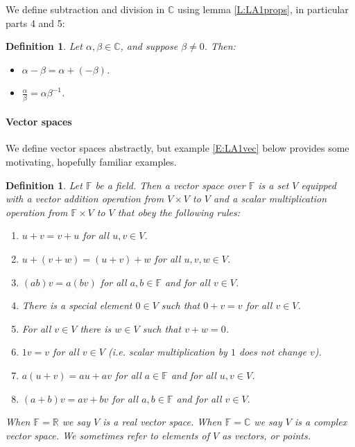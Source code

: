 \documentclass{article}
\theoremstyle{plain}
\newtheorem{definition}[theorem]{Definition}{\bfseries}{\upshape}
\newcommand{\bC}{\mathbb{C}}
\newcommand{\bR}{\mathbb{R}}
\newcommand{\bF}{\mathbb{F}}
\begin{document}
We define subtraction and division in $\bC$ using lemma \ref{L:LA1props}, in particular parts 4 and 5:

\begin{definition}
Let $\alpha,\beta\in\bC$, and suppose $\beta\neq 0$. Then:
\begin{itemize}
\item $\alpha - \beta = \alpha + (-\beta)$.
\item $\frac{\alpha}{\beta} = \alpha\beta^{-1}$.
\end{itemize}
\end{definition}

\paragraph{Vector spaces}

We define vector spaces abstractly, but example \ref{E:LA1vec} below provides some motivating, hopefully familiar examples.

\begin{definition}\label{D:LA1vec}
Let $\bF$ be a field. Then a \emph{vector space over $\bF$} is a set $V$ equipped with a vector addition operation from $V\times V$ to $V$ and a scalar multiplication operation from $\bF\times V$ to $V$ that obey the following rules:
\begin{enumerate}
\item $u + v = v + u$ for all $u,v\in V$.
\item $u + (v + w) = (u + v) + w$ for all $u,v,w\in V$.
\item $(ab)v = a(bv)$ for all $a,b\in\bF$ and for all $v\in V$.
\item There is a special element $0\in V$ such that $0 + v = v$ for all $v\in V$.
\item For all $v\in V$ there is $w\in V$ such that $v + w = 0$.
\item $1v = v$ for all $v\in V$ (i.e. scalar multiplication by $1$ does not change $v$).
\item $a(u+v) = au + av$ for all $a\in\bF$ and for all $u,v\in V$.
\item $(a+b)v = av + bv$ for all $a,b\in\bF$ and for all $v\in V$.
\end{enumerate}
When $\bF=\bR$ we say $V$ is a \emph{real vector space}. When $\bF=\bC$ we say $V$ is a \emph{complex vector space}. We sometimes refer to elements of $V$ as \emph{vectors}, or \emph{points}.
\end{definition}
\end{document}
